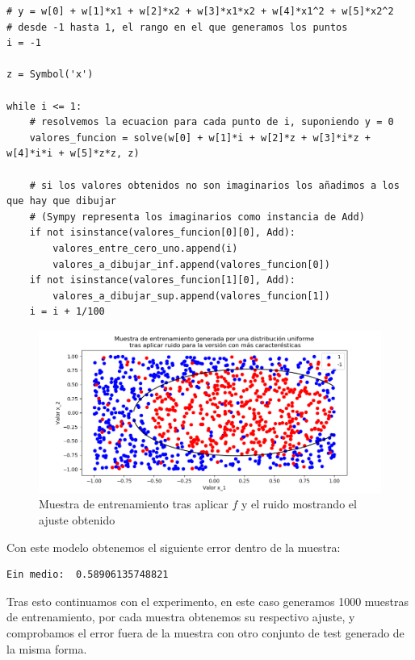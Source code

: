 \documentclass[12pt, spanish]{article}
\begin{document}
\begin{lstlisting}
# y = w[0] + w[1]*x1 + w[2]*x2 + w[3]*x1*x2 + w[4]*x1^2 + w[5]*x2^2
# desde -1 hasta 1, el rango en el que generamos los puntos
i = -1

z = Symbol('x')

while i <= 1:
	# resolvemos la ecuacion para cada punto de i, suponiendo y = 0
	valores_funcion = solve(w[0] + w[1]*i + w[2]*z + w[3]*i*z + w[4]*i*i + w[5]*z*z, z)

	# si los valores obtenidos no son imaginarios los añadimos a los que hay que dibujar
	# (Sympy representa los imaginarios como instancia de Add)
	if not isinstance(valores_funcion[0][0], Add):
		valores_entre_cero_uno.append(i)
		valores_a_dibujar_inf.append(valores_funcion[0])
	if not isinstance(valores_funcion[1][0], Add):
		valores_a_dibujar_sup.append(valores_funcion[1])
	i = i + 1/100

\end{lstlisting}

\begin{figure}[H]
  \centering
      \includegraphics[scale = 0.70]{muestra-f-r-6c.png}
 		 \caption{Muestra de entrenamiento tras aplicar $f$ y el ruido mostrando el ajuste obtenido}
  		\label{fig:ej2-2-m-f-r-1c}

\end{figure}

Con este modelo obtenemos el siguiente error dentro de la muestra:

\begin{lstlisting}
Ein medio:  0.58906135748821
\end{lstlisting}

Tras esto continuamos con el experimento, en este caso generamos 1000 muestras de entrenamiento, por cada muestra obtenemos su respectivo ajuste, y comprobamos el error fuera de la muestra con otro conjunto de test generado de la misma forma.
\end{document}
